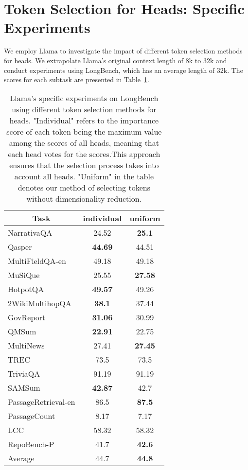 \section{Token Selection for Heads: Specific Experiments}
\label{sec:Token_Selection_for_Heads}
We employ Llama to investigate the impact of different token selection methods for heads. 
We extrapolate Llama's original context length of 8k to 32k and conduct experiments using LongBench, which has an average length of 32k.
The scores for each subtask are presented in Table~\ref{tab:token_selection_head_subtask}.
\begin{table}[]
  \begin{tabular}{l|cc}
  \hline
  \multicolumn{1}{c|}{Task} & individual     & uniform        \\ \hline
  NarrativaQA               & 24.52          & \textbf{25.1}  \\
  Qasper                    & \textbf{44.69} & 44.51          \\
  MultiFieldQA-en           & 49.18          & 49.18          \\
  MuSiQue                   & 25.55          & \textbf{27.58} \\
  HotpotQA                  & \textbf{49.57} & 49.26          \\
  2WikiMultihopQA           & \textbf{38.1}  & 37.44          \\
  GovReport                 & \textbf{31.06} & 30.99          \\
  QMSum                     & \textbf{22.91} & 22.75          \\
  MultiNews                 & 27.41          & \textbf{27.45} \\
  TREC                      & 73.5           & 73.5           \\
  TriviaQA                  & 91.19          & 91.19          \\
  SAMSum                    & \textbf{42.87} & 42.7           \\
  PassageRetrieval-en       & 86.5           & \textbf{87.5}  \\
  PassageCount              & 8.17           & 7.17           \\
  LCC                       & 58.32          & 58.32          \\
  RepoBench-P               & 41.7           & \textbf{42.6}  \\ \hline
  Average                   & 44.7           & \textbf{44.8}           \\ \hline
  \end{tabular}
  \caption{Llama's specific experiments on LongBench using different token selection methods for heads. "Individual" refers to the importance score of each token being the maximum value among the scores of all heads, meaning that each head votes for the scores.This approach ensures that the selection process takes into account all heads. "Uniform" in the table denotes our method of selecting tokens without dimensionality reduction.}
  \label{tab:token_selection_head_subtask}
  \end{table}

